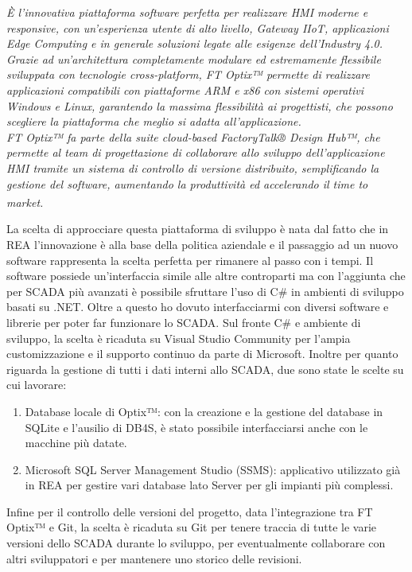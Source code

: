 \begin{displayquote}
    \textit{È l’innovativa piattaforma software perfetta per realizzare HMI moderne e responsive, con un’esperienza utente di alto livello, Gateway IIoT, applicazioni Edge Computing e in generale soluzioni legate alle esigenze dell’Industry 4.0.} \\ \textit{Grazie ad un’architettura completamente modulare ed estremamente flessibile sviluppata con tecnologie cross-platform, FT Optix™ permette di realizzare applicazioni compatibili con piattaforme ARM e x86 con sistemi operativi Windows e Linux, garantendo la massima flessibilità ai progettisti, che possono scegliere la piattaforma che meglio si adatta all’applicazione.} \\ \textit{FT Optix™ fa parte della suite cloud-based FactoryTalk® Design Hub™, che permette al team di progettazione di collaborare allo sviluppo dell’applicazione HMI tramite un sistema di controllo di versione distribuito, semplificando la gestione del software, aumentando la produttività ed accelerando il time to market.}\textsuperscript{\cite{asemautomation}}
\end{displayquote}

La scelta di approcciare questa piattaforma di sviluppo è nata dal fatto che in REA l'innovazione è alla base della politica aziendale e il passaggio ad un nuovo software rappresenta la scelta perfetta per rimanere al passo con i tempi. Il software possiede un'interfaccia simile alle altre controparti ma con l'aggiunta che per SCADA più avanzati è possibile sfruttare l'uso di C\# in ambienti di sviluppo basati su .NET. Oltre a questo ho dovuto interfacciarmi con diversi software e librerie per poter far funzionare lo SCADA. 
Sul fronte C\# e ambiente di sviluppo, la scelta è ricaduta su Visual Studio Community per l'ampia customizzazione e il supporto continuo da parte di Microsoft. Inoltre per quanto riguarda la gestione di tutti i dati interni allo SCADA, due sono state le scelte su cui lavorare:
\begin{enumerate}
    \item Database locale di Optix™: con la creazione e la gestione del database in SQLite e l'ausilio di DB4S, è stato possibile interfacciarsi anche con le macchine più datate.
    \item Microsoft SQL Server Management Studio (SSMS): applicativo utilizzato già in REA per gestire vari database lato Server per gli impianti più complessi.
\end{enumerate}
Infine per il controllo delle versioni del progetto, data l'integrazione tra FT Optix™ e Git, la scelta è ricaduta su Git per tenere traccia di tutte le varie versioni dello SCADA durante lo sviluppo, per eventualmente collaborare con altri sviluppatori e per mantenere uno storico delle revisioni. 

